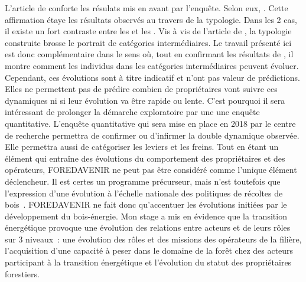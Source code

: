 \documentclass[12pt]{report}
\begin{document}
L'article de \citet{brahic2017_ref114} conforte les résulats mis en avant par
l'enquête.
Selon eux, . Cette affirmation étaye
les résultats observés au travers de la typologie. Dans les 2 cas, il existe un
fort contraste entre les  et les
. Vis à vis de l'article de \citet{brahic2017_ref114},
la typologie construite brosse le portrait de catégories intermédiaires. Le
travail présenté ici est donc complémentaire dans le sens où, tout en confirmant
les résultats de \citet{brahic2017_ref114}, il montre comment les individus
dans les catégories intermédiaires peuvent évoluer.
Cependant, ces évolutions sont à titre indicatif et n'ont pas valeur de prédictions.
Elles ne permettent pas de prédire
combien de propriétaires vont suivre ces dynamiques ni si leur évolution va
être rapide ou lente.
C'est pourquoi il sera intéressant de prolonger la démarche exploratoire par une
une enquête quantitative. L'enquête quantitative qui sera mise en place
en 2018 par le centre de recherche permettra de confirmer ou d'infirmer la
double dynamique observée. Elle permettra aussi de catégoriser les leviers et
les freins.
Tout en étant un élément qui entraîne des évolutions du comportement des propriétaires
et des opérateurs, FOREDAVENIR ne peut pas être considéré comme l'unique élément
déclencheur. Il est certes
un programme précurseur, mais n'est
toutefois que l'expression d'une évolution à l'échelle nationale des politiques
de récoltes de bois~\citep{sergent2014_ref110}. FOREDAVENIR ne fait donc
qu'accentuer les évolutions initiées par le développement du bois-énergie. Mon
stage a mis en évidence que la transition énergétique provoque une évolution des
relations entre acteurs et de leurs rôles sur 3 niveaux~: une évolution des
rôles et des missions des opérateurs de la filière, l'acquisition d'une capacité à peser
dans le domaine de la forêt chez des acteurs participant à la transition
énergétique et l'évolution du statut des propriétaires forestiers.\\
\end{document}
